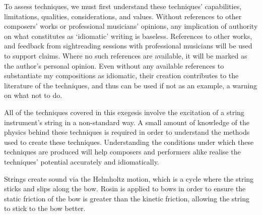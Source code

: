 To assess techniques, we must first understand these techniques' capabilities, limitations, qualities, considerations, and values.
Without references to other composers' works or professional musicians' opinions, any implication of authority on what constitutes as `idiomatic' writing is baseless.  
References to other works, and feedback from sightreading sessions with professional musicians will be used to support claims.
Where no such references are available, it will be marked as the author's personal opinion. 
Even without any available references to substantiate my compositions as idiomatic, their creation contributes to the literature of the techniques, and thus can be used if not as an example, a warning on what not to do.

All of the techniques covered in this exegesis involve the excitation of a string instrument's string in a non-standard way. 
A small amount of knowledge of the physics behind these techniques is required in order to understand the methods used to create these techniques.
Understanding the conditions under which these techniques are produced will help composers and performers alike realise the techniques' potential accurately and idiomatically.

Strings create sound via the Helmholtz motion, which is a cycle where the string sticks and slips along the bow.\autocite[]{wolfeBowsStrings2006}
Rosin is applied to bows in order to ensure the static friction of the bow is greater than the kinetic friction, allowing the string to stick to the bow better.

